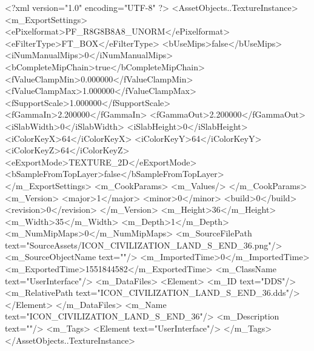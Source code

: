 <?xml version="1.0" encoding="UTF-8" ?>
<AssetObjects..TextureInstance>
	<m_ExportSettings>
		<ePixelformat>PF_R8G8B8A8_UNORM</ePixelformat>
		<eFilterType>FT_BOX</eFilterType>
		<bUseMips>false</bUseMips>
		<iNumManualMips>0</iNumManualMips>
		<bCompleteMipChain>true</bCompleteMipChain>
		<fValueClampMin>0.000000</fValueClampMin>
		<fValueClampMax>1.000000</fValueClampMax>
		<fSupportScale>1.000000</fSupportScale>
		<fGammaIn>2.200000</fGammaIn>
		<fGammaOut>2.200000</fGammaOut>
		<iSlabWidth>0</iSlabWidth>
		<iSlabHeight>0</iSlabHeight>
		<iColorKeyX>64</iColorKeyX>
		<iColorKeyY>64</iColorKeyY>
		<iColorKeyZ>64</iColorKeyZ>
		<eExportMode>TEXTURE_2D</eExportMode>
		<bSampleFromTopLayer>false</bSampleFromTopLayer>
	</m_ExportSettings>
	<m_CookParams>
		<m_Values/>
	</m_CookParams>
	<m_Version>
		<major>1</major>
		<minor>0</minor>
		<build>0</build>
		<revision>0</revision>
	</m_Version>
	<m_Height>36</m_Height>
	<m_Width>35</m_Width>
	<m_Depth>1</m_Depth>
	<m_NumMipMaps>0</m_NumMipMaps>
	<m_SourceFilePath text="SourceAssets/ICON_CIVILIZATION_LAND_S_END_36.png"/>
	<m_SourceObjectName text=""/>
	<m_ImportedTime>0</m_ImportedTime>
	<m_ExportedTime>1551844582</m_ExportedTime>
	<m_ClassName text="UserInterface"/>
	<m_DataFiles>
		<Element>
			<m_ID text="DDS"/>
			<m_RelativePath text="ICON_CIVILIZATION_LAND_S_END_36.dds"/>
		</Element>
	</m_DataFiles>
	<m_Name text="ICON_CIVILIZATION_LAND_S_END_36"/>
	<m_Description text=""/>
	<m_Tags>
		<Element text="UserInterface"/>
	</m_Tags>
</AssetObjects..TextureInstance>

